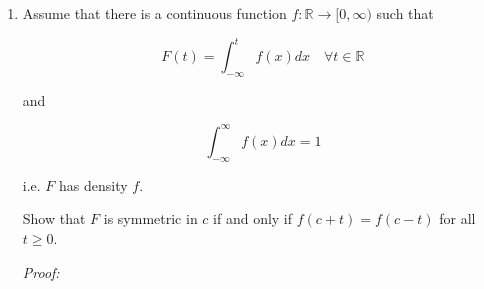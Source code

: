 \documentclass[12pt]{article}
\begin{document}
\begin{enumerate}
\begin{enumerate}
{(2): $F$ right continuity: $c+t_n$ is a sequence converging to $c+t$ from the right. 
}
\item \textbf{Third case:} $x=c$     and      $F(c)=1-F(c)$

  $s_n$ is a sequence converging to $c$ from the left. Let $t_n$ be a sequence such that $s_n =c - t_n$. Since $s_n \uparrow c$, then  \( t_n \downarrow 0 \) as \( n \to \infty \)
  
    \begin{align*}
        \lim_{n \to \infty} F(s_n) &= \lim_{n \to \infty} F(c-t_n)\\
        &\stackrel{\text{(1)}}{=} 1-\lim_{n \to \infty} F(c+t_n)\\
        &\stackrel{\text{(2)}}{=} 1-F(c)\\
        &= F(c)
    \end{align*}
    {\footnotesize
(1): $F$ is symetric in $c$.
    
    (2): $F$ right continuity: $c+t_n$ is a sequence converging to $c$ from the right.

    }

\end{enumerate}



\item Assume that there is a continuous function $f: \mathbb{R} \rightarrow[0, \infty)$ such that

$$
F(t)=\int_{-\infty}^{t} f(x) d x \quad \forall t \in \mathbb{R}
$$

and

$$
\int_{-\infty}^{\infty} f(x) d x=1
$$

i.e. $F$ has density $f$.


Show that $F$ is symmetric in $c$ if and only if $f(c+t)=f(c-t)$ for all $t \geq 0$.


\textit{Proof:}


\end{enumerate}
\end{document}
